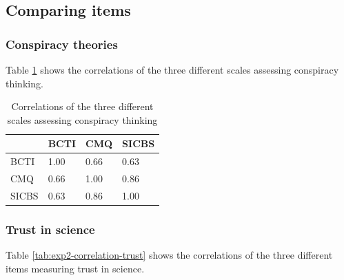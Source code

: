 \documentclass[
  doc,floatsintext]{apa6}
\begin{document}
\subsection{Comparing items}\label{comparing-items-1}

\subsubsection{Conspiracy theories}\label{conspiracy-theories-1}

Table \ref{tab:exp2-correlation-conspiracy} shows the correlations of the three different scales assessing conspiracy thinking.

\begin{table}[h]

\begin{center}
\begin{threeparttable}

\caption{\label{tab:exp2-correlation-conspiracy}Correlations of the three different scales assessing conspiracy thinking}

\begin{tabular}{llll}
\toprule
 & \multicolumn{1}{c}{BCTI} & \multicolumn{1}{c}{CMQ} & \multicolumn{1}{c}{SICBS}\\
\midrule
BCTI & 1.00 & 0.66 & 0.63\\
CMQ & 0.66 & 1.00 & 0.86\\
SICBS & 0.63 & 0.86 & 1.00\\
\bottomrule
\end{tabular}

\end{threeparttable}
\end{center}

\end{table}

\subsubsection{Trust in science}\label{trust-in-science-2}

Table \ref{tab:exp2-correlation-trust} shows the correlations of the three different items measuring trust in science.
\end{document}
